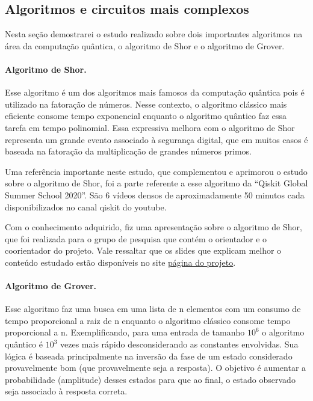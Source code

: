 \documentclass{article}
\begin{document}
    \subsection{Algoritmos e circuitos mais complexos}
        Nesta seção demostrarei o estudo realizado sobre dois importantes algoritmos na área da computação quântica, o algoritmo de Shor e o algoritmo de Grover.
        
        \paragraph{Algoritmo de Shor.}
        Esse algoritmo é um dos algoritmos mais famosos da computação quântica pois é utilizado na fatoração de números. Nesse contexto, o algoritmo clássico mais eficiente consome tempo exponencial enquanto o algoritmo quântico faz essa tarefa em tempo polinomial. Essa expressiva melhora com o algoritmo de Shor representa um grande evento associado à segurança digital, que em muitos casos é baseada na fatoração da multiplicação de grandes números primos.
        
        Uma referência importante neste estudo, que complementou e aprimorou o estudo sobre o algoritmo de Shor, foi a parte referente a esse algoritmo da ``Qiskit Global Summer School 2020''. São 6 vídeos densos de aproximadamente 50 minutos cada disponibilizados no canal qiskit do youtube.
        
        Com o conhecimento adquirido, fiz uma apresentação sobre o algoritmo de Shor, que foi realizada para o grupo de pesquisa que contém o orientador e o coorientador do projeto. Vale ressaltar que os slides que explicam melhor o conteúdo estudado estão disponíveis no site \href{https://interscity.org/quantum-internet/}{página do projeto}.
    
        \paragraph{Algoritmo de Grover.}
        Esse algoritmo faz uma busca em uma lista de n elementos com um consumo de tempo proporcional a raiz de n enquanto o algoritmo clássico consome tempo proporcional a n. Exemplificando, para uma entrada de tamanho $10^{6}$ o algoritmo quântico é $10^{3}$ vezes mais rápido desconsiderando as constantes envolvidas. Sua lógica é baseada principalmente na inversão da fase de um estado considerado provavelmente bom (que provavelmente seja a resposta). O objetivo é aumentar a probabilidade (amplitude) desses estados para que ao final, o estado observado seja associado à resposta correta.
\end{document}

